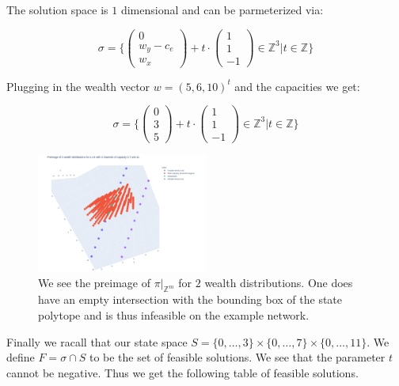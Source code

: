 \documentclass[10pt,twocolumn]{article}
\begin{document}
The solution space is $1$ dimensional and can be parmeterized via:

$$\sigma = \{\begin{pmatrix}0\\w_y-c_e\\w_x\end{pmatrix} + t\cdot\begin{pmatrix}1\\1\\-1\end{pmatrix}\in\mathbb{Z}^3| t\in\mathbb{Z}\}$$

Plugging in the wealth vector $w=(5,6,10)^t$ and the capacities we get:

$$\sigma = \{\begin{pmatrix}0\\3\\5\end{pmatrix} + t\cdot\begin{pmatrix}1\\1\\-1\end{pmatrix}\in\mathbb{Z}^3| t\in\mathbb{Z}\}$$


\begin{figure}[h]
  \label{fig:preimage}
\centering
\includegraphics[width=0.5\textwidth]{preimage}
\caption{We see the preimage of $\pi|_{\mathbb{Z}^m}$ for $2$ wealth distributions. One does have an empty intersection with the bounding box of the state polytope and is thus infeasible on the example network.}
\end{figure}

Finally we racall that our state space $S=\{0,\dots,3\}\times\{0,\dots,7\}\times\{0,\dots,11\}$.
We define $F = \sigma\cap S$ to be the set of feasible solutions.
We see that the parameter $t$ cannot be negative. Thus we get the following table of feasible solutions.
\end{document}
